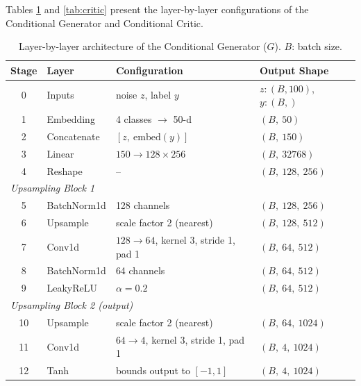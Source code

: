 \documentclass[12pt]{article}
\begin{document}
Tables \ref{tab:generator} and \ref{tab:critic} present the layer-by-layer configurations of the Conditional Generator and Conditional Critic.

\begin{table}[H]
\centering
\caption{Layer-by-layer architecture of the Conditional Generator ($G$). $B$: batch size.}
\label{tab:generator}
\begin{tabular}{@{}clll@{}}
\toprule
\textbf{Stage} & \textbf{Layer} & \textbf{Configuration} & \textbf{Output Shape} \\
\midrule
0 & Inputs & noise $z$, label $y$ & $z{:}(B,100)$, $y{:}(B,)$ \\
1 & Embedding & 4 classes $\to$ 50-d & $(B,\ 50)$ \\
2 & Concatenate & $[z,\ \text{embed}(y)]$ & $(B,\ 150)$ \\
3 & Linear & $150 \to 128{\times}256$ & $(B,\ 32768)$ \\
4 & Reshape & -- & $(B,\ 128,\ 256)$ \\
\midrule
\multicolumn{4}{l}{\textit{Upsampling Block 1}} \\
5 & BatchNorm1d & 128 channels & $(B,\ 128,\ 256)$ \\
6 & Upsample & scale factor 2 (nearest) & $(B,\ 128,\ 512)$ \\
7 & Conv1d & $128{\to}64$, kernel 3, stride 1, pad 1 & $(B,\ 64,\ 512)$ \\
8 & BatchNorm1d & 64 channels & $(B,\ 64,\ 512)$ \\
9 & LeakyReLU & $\alpha{=}0.2$ & $(B,\ 64,\ 512)$ \\
\midrule
\multicolumn{4}{l}{\textit{Upsampling Block 2 (output)}} \\
10 & Upsample & scale factor 2 (nearest) & $(B,\ 64,\ 1024)$ \\
11 & Conv1d & $64{\to}4$, kernel 3, stride 1, pad 1 & $(B,\ 4,\ 1024)$ \\
12 & Tanh & bounds output to $[-1,1]$ & $(B,\ 4,\ 1024)$ \\
\bottomrule
\end{tabular}
\end{table}
\end{document}
